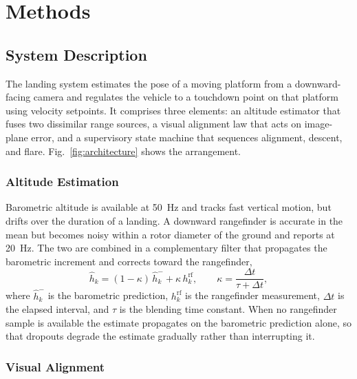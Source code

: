 
\section{Methods}

\subsection{System Description}

The landing system estimates the pose of a moving platform from a downward-facing
camera and regulates the vehicle to a touchdown point on that platform using
velocity setpoints. It comprises three elements: an altitude estimator that fuses
two dissimilar range sources, a visual alignment law that acts on image-plane
error, and a supervisory state machine that sequences alignment, descent, and
flare. Fig.~\ref{fig:architecture} shows the arrangement.

\subsubsection{Altitude Estimation}

Barometric altitude is available at \SI{50}{\hertz} and tracks fast vertical
motion, but drifts over the duration of a landing. A downward rangefinder is
accurate in the mean but becomes noisy within a rotor diameter of the ground and
reports at \SI{20}{\hertz}. The two are combined in a complementary filter that
propagates the barometric increment and corrects toward the rangefinder,
\begin{equation}
  \hat{h}_k = (1-\kappa)\,\hat{h}_k^{-} + \kappa\, h^{\mathrm{rf}}_k ,
  \qquad
  \kappa = \frac{\Delta t}{\tau + \Delta t},
  \label{eq:compfilter}
\end{equation}
where $\hat{h}_k^{-}$ is the barometric prediction, $h^{\mathrm{rf}}_k$ is the
rangefinder measurement, $\Delta t$ is the elapsed interval, and $\tau$ is the
blending time constant. When no rangefinder sample is available the estimate
propagates on the barometric prediction alone, so that dropouts degrade the
estimate gradually rather than interrupting it.

\subsubsection{Visual Alignment}

